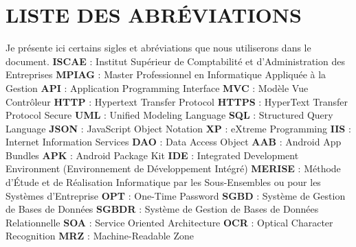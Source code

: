 \documentclass[a4paper, 12pt]{report}
\begin{document}
	\chapter*{LISTE DES ABRÉVIATIONS} \label{chap:1SIGLES ET ABREVIATIONS}
	Je présente ici certains sigles et abréviations que nous utiliserons dans le document.
	\newline\newline
	\textbf{ISCAE} : Institut Supérieur de Comptabilité et d’Administration des Entreprises \newline
	\textbf{MPIAG} : Master Professionnel en Informatique Appliquée à la Gestion \newline
	\textbf{API} : Application Programming Interface \newline
	\textbf{MVC} : Modèle Vue Contrôleur \newline
	\textbf{HTTP} : Hypertext Transfer Protocol \newline
	\textbf{HTTPS} : HyperText Transfer Protocol Secure \newline
	\textbf{UML} : Unified Modeling Language \newline
	\textbf{SQL} : Structured Query Language \newline
	\textbf{JSON} : JavaScript Object Notation \newline
	\textbf{XP} : eXtreme Programming \newline
	\textbf{IIS} : Internet Information Services \newline
	\textbf{DAO} : Data Access Object \newline
	\textbf{AAB} : Android App Bundles \newline
	\textbf{APK} : Android Package Kit \newline
	\textbf{IDE} : Integrated Development Environment (Environnement de Développement Intégré) \newline
	\textbf{MERISE} : Méthode d’Étude et de Réalisation Informatique par les Sous-Ensembles ou pour les Systèmes d’Entreprise \newline
	\textbf{OPT} : One-Time Password \newline
	\textbf{SGBD} : Système de Gestion de Bases de Données \newline
	\textbf{SGBDR} : Système de Gestion de Bases de Données Relationnelle \newline
	\textbf{SOA} : Service Oriented Architecture \newline
	\textbf{OCR} : Optical Character Recognition  \newline
	\textbf{MRZ} : Machine-Readable Zone  
	\thispagestyle{empty}
	
	\tableofcontents
	\thispagestyle{empty}
	
	
	
	
\end{document}
